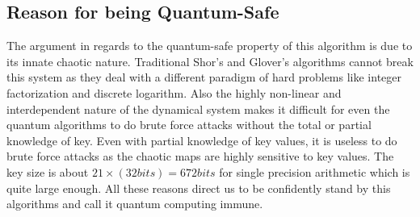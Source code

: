 
\subsection{Reason for being Quantum-Safe}
The argument in regards to the quantum-safe property of this algorithm is due to its innate chaotic nature. Traditional Shor's and Glover's algorithms cannot break this system as they deal with a different paradigm of hard problems like integer factorization and discrete logarithm. Also the highly non-linear and interdependent nature of the dynamical system makes it difficult for even the quantum algorithms to do brute force attacks without the total or partial knowledge of key. Even with partial knowledge of key values, it is useless to do brute force attacks as the chaotic maps are highly sensitive to key values. The key size is about $21\times(32 bits) = 672 bits$ for single precision arithmetic which is quite large enough. All these reasons direct us to be confidently stand by this algorithms and call it quantum computing immune. 

